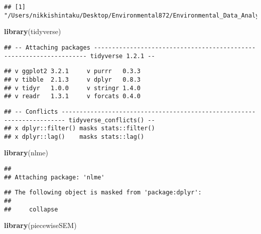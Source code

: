 \documentclass[]{article}
\newenvironment{Shaded}{\begin{snugshade}}{\end{snugshade}}
\newcommand{\CommentTok}[1]{\textcolor[rgb]{0.56,0.35,0.01}{\textit{#1}}}
\newcommand{\KeywordTok}[1]{\textcolor[rgb]{0.13,0.29,0.53}{\textbf{#1}}}
\newcommand{\NormalTok}[1]{#1}
\begin{document}
\begin{Shaded}
\end{Shaded}

\begin{verbatim}
## [1] "/Users/nikkishintaku/Desktop/Environmental872/Environmental_Data_Analytics_2020"
\end{verbatim}

\begin{Shaded}
\begin{Highlighting}[]
\KeywordTok{library}\NormalTok{(tidyverse)}
\end{Highlighting}
\end{Shaded}

\begin{verbatim}
## -- Attaching packages -------------------------------------------------------------------- tidyverse 1.2.1 --
\end{verbatim}

\begin{verbatim}
## v ggplot2 3.2.1     v purrr   0.3.3
## v tibble  2.1.3     v dplyr   0.8.3
## v tidyr   1.0.0     v stringr 1.4.0
## v readr   1.3.1     v forcats 0.4.0
\end{verbatim}

\begin{verbatim}
## -- Conflicts ----------------------------------------------------------------------- tidyverse_conflicts() --
## x dplyr::filter() masks stats::filter()
## x dplyr::lag()    masks stats::lag()
\end{verbatim}

\begin{Shaded}
\begin{Highlighting}[]
\KeywordTok{library}\NormalTok{(nlme)}
\end{Highlighting}
\end{Shaded}

\begin{verbatim}
## 
## Attaching package: 'nlme'
\end{verbatim}

\begin{verbatim}
## The following object is masked from 'package:dplyr':
## 
##     collapse
\end{verbatim}

\begin{Shaded}
\begin{Highlighting}[]
\KeywordTok{library}\NormalTok{(piecewiseSEM)}
\end{Highlighting}
\end{Shaded}
\end{document}
